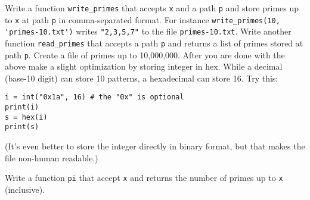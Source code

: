 \begin{ex}
  Write a function \verb!write_primes! that accepts \verb!x! and a path \verb!p!
  and store primes up to \verb!x! at path \verb!p! in comma-separated format.
  For instance \verb!write_primes(10, 'primes-10.txt')!
  writes \verb!"2,3,5,7"! to the file \verb!primes-10.txt!.
  Write another function \verb!read_primes! that accepts a path \verb!p!
  and returns a list of primes stored at path \verb!p!.
  Create a file of primes up to 10,000,000.
  After you are done with the above make a slight optimization by storing
  integer in hex.
  While a decimal (base-10 digit) can store 10 patterns,
  a hexadecimal can store 16.
  Try this:
  \begin{Verbatim}[frame=single,fontsize=\footnotesize]
i = int("0x1a", 16) # the "0x" is optional
print(i)
s = hex(i)
print(s)
  \end{Verbatim}
  (It's even better to store the integer directly in binary format, but
  that makes the file non-human readable.)
\end{ex}

\begin{ex}
  Write a function \verb!pi! that accept \verb!x! and returns
  the number of primes up to \verb!x! (inclusive).
\end{ex}


